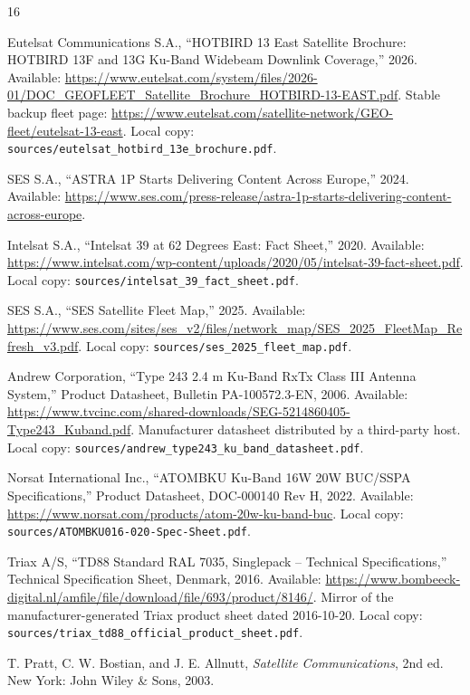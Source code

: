 \begin{thebibliography}{16}

Eutelsat Communications S.A., ``HOTBIRD 13 East Satellite Brochure: HOTBIRD 13F and 13G Ku-Band Widebeam Downlink Coverage,'' 2026. Available: \url{https://www.eutelsat.com/system/files/2026-01/DOC_GEOFLEET_Satellite_Brochure_HOTBIRD-13-EAST.pdf}. Stable backup fleet page: \url{https://www.eutelsat.com/satellite-network/GEO-fleet/eutelsat-13-east}. Local copy: \texttt{sources/eutelsat\_hotbird\_13e\_brochure.pdf}.

SES S.A., ``ASTRA 1P Starts Delivering Content Across Europe,'' 2024. Available: \url{https://www.ses.com/press-release/astra-1p-starts-delivering-content-across-europe}.

Intelsat S.A., ``Intelsat 39 at 62 Degrees East: Fact Sheet,'' 2020. Available: \url{https://www.intelsat.com/wp-content/uploads/2020/05/intelsat-39-fact-sheet.pdf}. Local copy: \texttt{sources/intelsat\_39\_fact\_sheet.pdf}.

SES S.A., ``SES Satellite Fleet Map,'' 2025. Available: \url{https://www.ses.com/sites/ses_v2/files/network_map/SES_2025_FleetMap_Refresh_v3.pdf}. Local copy: \texttt{sources/ses\_2025\_fleet\_map.pdf}.

Andrew Corporation, ``Type 243 2.4 m Ku-Band RxTx Class III Antenna System,'' Product Datasheet, Bulletin PA-100572.3-EN, 2006. Available: \url{https://www.tvcinc.com/shared-downloads/SEG-5214860405-Type243_Kuband.pdf}. Manufacturer datasheet distributed by a third-party host. Local copy: \texttt{sources/andrew\_type243\_ku\_band\_datasheet.pdf}.

Norsat International Inc., ``ATOMBKU Ku-Band 16W 20W BUC/SSPA Specifications,'' Product Datasheet, DOC-000140 Rev H, 2022. Available: \url{https://www.norsat.com/products/atom-20w-ku-band-buc}. Local copy: \texttt{sources/ATOMBKU016-020-Spec-Sheet.pdf}.

Triax A/S, ``TD88 Standard RAL 7035, Singlepack -- Technical Specifications,'' Technical Specification Sheet, Denmark, 2016. Available: \url{https://www.bombeeck-digital.nl/amfile/file/download/file/693/product/8146/}. Mirror of the manufacturer-generated Triax product sheet dated 2016-10-20. Local copy: \texttt{sources/triax\_td88\_official\_product\_sheet.pdf}.

T. Pratt, C. W. Bostian, and J. E. Allnutt, \textit{Satellite Communications}, 2nd ed. New York: John Wiley \& Sons, 2003.


\end{thebibliography}
